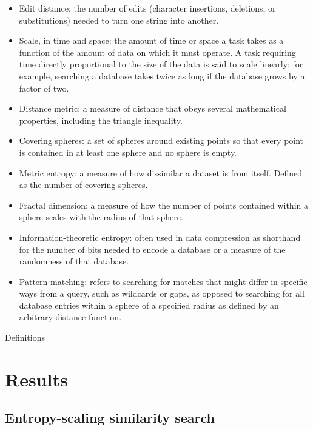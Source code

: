 \documentclass[11pt]{elsarticle}
\theoremstyle{definition}
\theoremstyle{remark}
\numberwithin{equation}{section}
\begin{document}
\begin{glosbox}[tbhp]
        \small
    \begin{itemize}
        \item Edit distance: the number of edits (character insertions, deletions, or substitutions) needed to turn one string into another.
        \item Scale, in time and space: the amount of time or space a task takes as a function of the amount of data on which it must operate. A task requiring time directly proportional to the size of the data is said to scale linearly; for example, searching a database takes twice as long if the database grows by a factor of two.
        \item Distance metric: a measure of distance that obeys several mathematical properties, including the triangle inequality.
        \item Covering spheres: a set of spheres around existing points so that every point is contained in at least one sphere and no sphere is empty.
        \item Metric entropy: a measure of how dissimilar a dataset is from itself. Defined as the number of covering spheres.
        \item Fractal dimension: a measure of how the number of points contained within a sphere scales with the radius of that sphere.
        \item Information-theoretic entropy: often used in data compression as shorthand for the number of bits needed to encode a database or a measure of the randomness of that database.
        \item Pattern matching: refers to searching for matches that might differ in specific ways from a query, such as wildcards or gaps, as opposed to searching for all database entries within a sphere of a specified radius as defined by an arbitrary distance function.
    \end{itemize}
    \caption{Definitions}
    \label{box:glos}
\end{glosbox}

\section{Results}

\subsection{Entropy-scaling similarity search}
\end{document}
